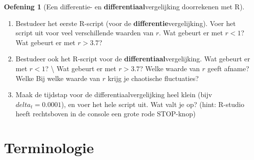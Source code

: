 \documentclass[
  a4paper,
]{scrbook}
\providecommand{\tightlist}{%
  \setlength{\itemsep}{0pt}\setlength{\parskip}{0pt}}\usepackage{longtable,booktabs,array}
\theoremstyle{definition}
\newtheorem{exercise}{Oefening}[chapter]
\theoremstyle{remark}
\begin{document}
\begin{exercise}[Een differentie- en \textbf{differentiaal}vergelijking
doorrekenen met
R]
\begin{enumerate}
\def\labelenumi{\alph{enumi}.}
\tightlist
\item
  Bestudeer het eerste R-script (voor de
  \textbf{differentie}vergelijking). Voer het script uit voor veel
  verschillende waarden van \(r\). Wat gebeurt er met \(r<1\)? Wat
  gebeurt er met \(r>3.7\)?
\item
  Bestudeer ook het R-script voor de \textbf{differentiaal}vergelijking.
  Wat gebeurt er met \(r<1\)? \textbackslash{} Wat gebeurt er met
  \(r>3.7\)? Welke waarde van \(r\) geeft afname? Welke Bij welke waarde
  van \(r\) krijg je chaotische fluctuaties?
\item
  Maak de tijdstap voor de differentiaalvergelijking heel klein (bijv
  \(delta_t = 0.0001\)), en voer het hele script uit. Wat valt je op?
  (hint: R-studio heeft rechtsboven in de console een grote rode
  STOP-knop)
\end{enumerate}

\end{exercise}

\section{Terminologie}\label{terminologie-2}
\end{document}
